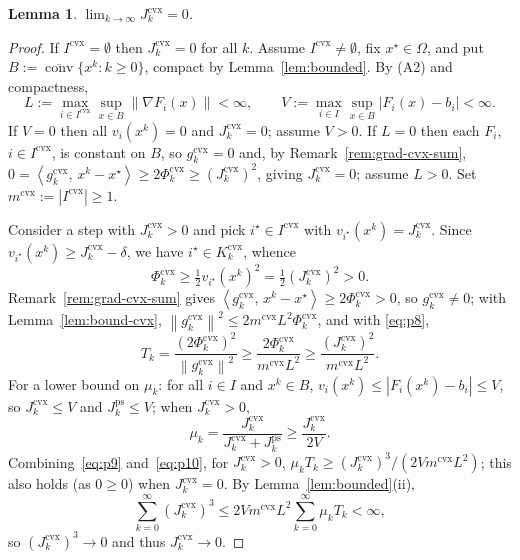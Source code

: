 \documentclass[]{interact}
\theoremstyle{plain}
\newtheorem{lemma}[theorem]{Lemma}
\theoremstyle{definition}
\theoremstyle{remark}
\newcommand{\norm}[1]{\left\lVert #1 \right\rVert}
\newcommand{\abs}[1]{\left\lvert #1 \right\rvert}
\newcommand{\inner}[2]{\left\langle #1,\, #2 \right\rangle}
\DeclareMathOperator{\conv}{conv}
\newcommand{\cvx}{\mathrm{cvx}}
\newcommand{\ps}{\mathrm{ps}}
\begin{document}
\begin{lemma}\label{lem:jcvx0}
$\displaystyle\lim_{k\to\infty}J^{\cvx}_k=0$.
\end{lemma}
\begin{proof}
If $I^{\cvx}=\emptyset$ then $J^{\cvx}_k=0$ for all $k$. Assume $I^{\cvx}\ne\emptyset$, fix $x^\star\in\Omega$, and put $B:=\overline{\conv}\{x^k:k\ge0\}$, compact by Lemma~\ref{lem:bounded}. By (A2) and compactness,
\[
L:=\max_{i\in I^{\cvx}}\sup_{x\in B}\norm{\nabla F_i(x)}<\infty,\qquad
V:=\max_{i\in I}\sup_{x\in B}\abs{F_i(x)-b_i}<\infty.
\]
If $V=0$ then all $v_i(x^k)=0$ and $J^{\cvx}_k=0$; assume $V>0$. If $L=0$ then each $F_i$, $i\in I^{\cvx}$, is constant on $B$, so $g^{\cvx}_k=0$ and, by Remark~\ref{rem:grad-cvx-sum}, $0=\inner{g^{\cvx}_k}{x^k-x^\star}\ge 2\Phi^{\cvx}_k\ge(J^{\cvx}_k)^2$, giving $J^{\cvx}_k=0$; assume $L>0$. Set $m^{\cvx}:=\abs{I^{\cvx}}\ge1$.

Consider a step with $J^{\cvx}_k>0$ and pick $i^\star\in I^{\cvx}$ with $v_{i^\star}(x^k)=J^{\cvx}_k$. Since $v_{i^\star}(x^k)\ge J^{\cvx}_k-\delta$, we have $i^\star\in K^{\cvx}_k$, whence
\begin{equation}\label{eq:p8}
\Phi^{\cvx}_k\ge\tfrac12 v_{i^\star}(x^k)^2=\tfrac12(J^{\cvx}_k)^2>0 .
\end{equation}
Remark~\ref{rem:grad-cvx-sum} gives $\inner{g^{\cvx}_k}{x^k-x^\star}\ge2\Phi^{\cvx}_k>0$, so $g^{\cvx}_k\ne0$; with Lemma~\ref{lem:bound-cvx}, $\norm{g^{\cvx}_k}^2\le2m^{\cvx}L^2\Phi^{\cvx}_k$, and with \eqref{eq:p8},
\begin{equation}\label{eq:p9}
T_k=\frac{(2\Phi^{\cvx}_k)^2}{\norm{g^{\cvx}_k}^2}\ge\frac{2\Phi^{\cvx}_k}{m^{\cvx}L^2}\ge\frac{(J^{\cvx}_k)^2}{m^{\cvx}L^2}.
\end{equation}
For a lower bound on $\mu_k$: for all $i\in I$ and $x^k\in B$, $v_i(x^k)\le\abs{F_i(x^k)-b_i}\le V$, so $J^{\cvx}_k\le V$ and $J^{\ps}_k\le V$; when $J^{\cvx}_k>0$,
\begin{equation}\label{eq:p10}
\mu_k=\frac{J^{\cvx}_k}{J^{\cvx}_k+J^{\ps}_k}\ge\frac{J^{\cvx}_k}{2V}.
\end{equation}
Combining~\eqref{eq:p9} and~\eqref{eq:p10}, for $J^{\cvx}_k>0$, $\mu_k T_k\ge(J^{\cvx}_k)^3/(2Vm^{\cvx}L^2)$; this also holds (as $0\ge0$) when $J^{\cvx}_k=0$. By Lemma~\ref{lem:bounded}(ii),
\begin{equation}\label{eq:p12}
\sum_{k=0}^\infty(J^{\cvx}_k)^3\le 2Vm^{\cvx}L^2\sum_{k=0}^\infty\mu_k T_k<\infty,
\end{equation}
so $(J^{\cvx}_k)^3\to0$ and thus $J^{\cvx}_k\to0$.
\end{proof}
\end{document}
